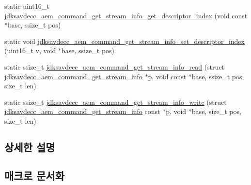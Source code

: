 \begin{DoxyCompactItemize}
\item 
static uint16\+\_\+t \hyperlink{group__command__get__stream__info_gab4d33aa1febff93a65ce72a9457aeb3d}{jdksavdecc\+\_\+aem\+\_\+command\+\_\+get\+\_\+stream\+\_\+info\+\_\+get\+\_\+descriptor\+\_\+index} (void const $\ast$base, ssize\+\_\+t pos)
\item 
static void \hyperlink{group__command__get__stream__info_ga52d51d97e8d070e0b0072c1cadc5e42e}{jdksavdecc\+\_\+aem\+\_\+command\+\_\+get\+\_\+stream\+\_\+info\+\_\+set\+\_\+descriptor\+\_\+index} (uint16\+\_\+t v, void $\ast$base, ssize\+\_\+t pos)
\item 
static ssize\+\_\+t \hyperlink{group__command__get__stream__info_ga822a3dfc0a554599609eaf0527671a2d}{jdksavdecc\+\_\+aem\+\_\+command\+\_\+get\+\_\+stream\+\_\+info\+\_\+read} (struct \hyperlink{structjdksavdecc__aem__command__get__stream__info}{jdksavdecc\+\_\+aem\+\_\+command\+\_\+get\+\_\+stream\+\_\+info} $\ast$p, void const $\ast$base, ssize\+\_\+t pos, size\+\_\+t len)
\item 
static ssize\+\_\+t \hyperlink{group__command__get__stream__info_gadc285f26ae5f9e8931b21e4712684f1a}{jdksavdecc\+\_\+aem\+\_\+command\+\_\+get\+\_\+stream\+\_\+info\+\_\+write} (struct \hyperlink{structjdksavdecc__aem__command__get__stream__info}{jdksavdecc\+\_\+aem\+\_\+command\+\_\+get\+\_\+stream\+\_\+info} const $\ast$p, void $\ast$base, size\+\_\+t pos, size\+\_\+t len)
\end{DoxyCompactItemize}


\subsection{상세한 설명}


\subsection{매크로 문서화}
